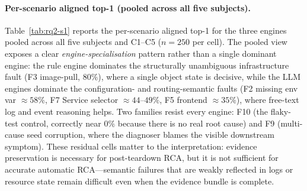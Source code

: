 \documentclass[sigconf, nonacm=true, anonymous=false, review=false]{acmart}
\newcommand{\Cn}[1]{C#1\xspace}
\newcommand{\fn}[1]{F#1\xspace}
\begin{document}
\paragraph{Per-scenario aligned top-1 (pooled across all five subjects).}
Table~\ref{tab:rq2-s1} reports the per-scenario aligned top-1 for the
three engines pooled across all five subjects and \Cn{1}--\Cn{5}
($n = 250$ per cell). The pooled view exposes a clear
\emph{engine-specialisation} pattern rather than a single dominant
engine: the rule engine dominates the structurally unambiguous
infrastructure fault (\fn{3} image-pull, $80\%$), where a single object
state is decisive, while the LLM engines dominate the configuration- and
routing-semantic faults (\fn{2} missing env var ${\approx}58\%$,
\fn{7} Service selector ${\approx}44$--$49\%$, \fn{5} frontend
${\approx}35\%$), where free-text log and event reasoning helps. Two
families resist every engine: \fn{10} (the flaky-test control, correctly
near $0\%$ because there is no real root cause) and \fn{9} (multi-cause
seed corruption, where the diagnoser blames the visible downstream
symptom). These residual cells matter to the interpretation: evidence
preservation is necessary for post-teardown RCA, but it is not
sufficient for accurate automatic RCA---semantic failures that are
weakly reflected in logs or resource state remain difficult even when
the evidence bundle is complete.
\end{document}

